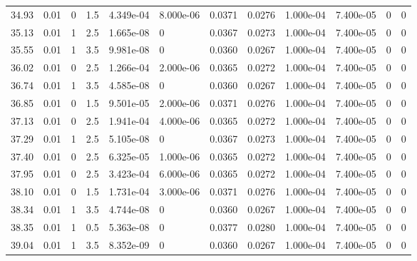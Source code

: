 \documentclass[preview]{standalone}
\begin{document}
{{{{\begin{tabular}{L{1.2cm}C{1.2cm} C{0.3cm}C{0.5cm} C{1.4cm}C{1.4cm} C{1.4cm}C{1.4cm} C{1.6cm}C{1.6cm} C{1.6cm}C{1.6cm}}
  34.93  &  0.01  & 0     & 1.5 &  4.349e-04  & 8.000e-06  &  0.0371&   0.0276& 1.000e-04 & 7.400e-05   &  0 & 0  \\ 
  35.13  &  0.01  & 1     & 2.5 &  1.665e-08  & 0  &  0.0367&   0.0273& 1.000e-04 & 7.400e-05   &  0 & 0  \\ 
  35.55  &  0.01  & 1     & 3.5 &  9.981e-08  & 0  &  0.0360&   0.0267& 1.000e-04 & 7.400e-05   &  0 & 0  \\ 
  36.02  &  0.01  & 0     & 2.5 &  1.266e-04  & 2.000e-06  &  0.0365&   0.0272& 1.000e-04 & 7.400e-05   &  0 & 0  \\ 
  36.74  &  0.01  & 1     & 3.5 &  4.585e-08  & 0  &  0.0360&   0.0267& 1.000e-04 & 7.400e-05   &  0 & 0  \\ 
  36.85  &  0.01  & 0     & 1.5 &  9.501e-05  & 2.000e-06  &  0.0371&   0.0276& 1.000e-04 & 7.400e-05   &  0 & 0  \\ 
  37.13  &  0.01  & 0     & 2.5 &  1.941e-04  & 4.000e-06  &  0.0365&   0.0272& 1.000e-04 & 7.400e-05   &  0 & 0  \\ 
  37.29  &  0.01  & 1     & 2.5 &  5.105e-08  & 0  &  0.0367&   0.0273& 1.000e-04 & 7.400e-05   &  0 & 0  \\ 
  37.40  &  0.01  & 0     & 2.5 &  6.325e-05  & 1.000e-06  &  0.0365&   0.0272& 1.000e-04 & 7.400e-05   &  0 & 0  \\ 
  37.95  &  0.01  & 0     & 2.5 &  3.423e-04  & 6.000e-06  &  0.0365&   0.0272& 1.000e-04 & 7.400e-05   &  0 & 0  \\ 
  38.10  &  0.01  & 0     & 1.5 &  1.731e-04  & 3.000e-06  &  0.0371&   0.0276& 1.000e-04 & 7.400e-05   &  0 & 0  \\ 
  38.34  &  0.01  & 1     & 3.5 &  4.744e-08  & 0  &  0.0360&   0.0267& 1.000e-04 & 7.400e-05   &  0 & 0  \\ 
  38.35  &  0.01  & 1     & 0.5 &  5.363e-08  & 0  &  0.0377&   0.0280& 1.000e-04 & 7.400e-05   &  0 & 0  \\ 
  39.04  &  0.01  & 1     & 3.5 &  8.352e-09  & 0  &  0.0360&   0.0267& 1.000e-04 & 7.400e-05   &  0 & 0  \\ 
\hline 
\end{tabular} 

}}}}
\end{document}
